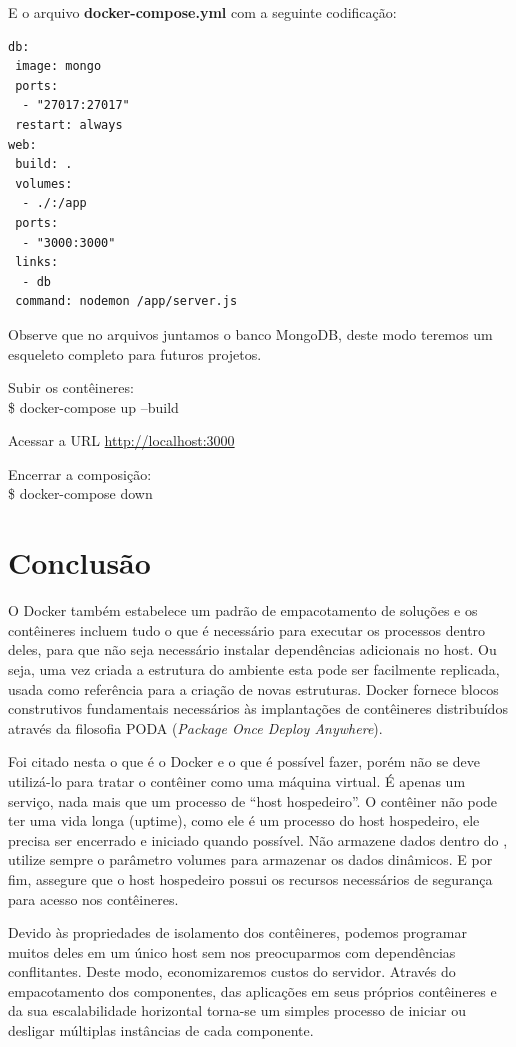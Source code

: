 \documentclass[a4paper,11pt]{article}
\begin{document}
E o arquivo \textbf{docker-compose.yml} com a seguinte codificação:
\begin{lstlisting}
db:
 image: mongo
 ports:
  - "27017:27017"
 restart: always
web:
 build: .
 volumes:
  - ./:/app
 ports:
  - "3000:3000"
 links:
  - db
 command: nodemon /app/server.js
\end{lstlisting}

Observe que no arquivos juntamos o banco MongoDB, deste modo teremos um esqueleto completo para futuros projetos. 

Subir os contêineres: \\
{\ttfamily\$ docker-compose up --build}

Acessar a URL \url{http://localhost:3000}

Encerrar a composição: \\
{\ttfamily\$ docker-compose down}

\section{Conclusão}
O Docker também estabelece um padrão de empacotamento de soluções e os contêineres incluem tudo o que é necessário para executar os processos dentro deles, para que não seja necessário instalar dependências adicionais no host. Ou seja, uma vez criada a estrutura do ambiente esta pode ser facilmente replicada, usada como referência para a criação de novas estruturas. Docker fornece blocos construtivos fundamentais necessários às implantações de contêineres distribuídos através da filosofia PODA (\textit{Package Once Deploy Anywhere}).

Foi citado nesta o que é o Docker e o que é possível fazer, porém não se deve utilizá-lo para tratar o contêiner como uma máquina virtual. É apenas um serviço, nada mais que um processo de ``host hospedeiro''. O contêiner não pode ter uma vida longa (uptime), como ele é um processo do host hospedeiro, ele precisa ser encerrado e iniciado quando possível. Não armazene dados dentro do , utilize sempre o parâmetro volumes para armazenar os dados dinâmicos. E por fim, assegure que o host hospedeiro possui os recursos necessários de segurança para acesso nos contêineres.

Devido às propriedades de isolamento dos contêineres, podemos programar muitos deles em um único host sem nos preocuparmos com dependências conflitantes. Deste modo, economizaremos custos do servidor. Através do empacotamento dos componentes, das aplicações em seus próprios contêineres e da sua escalabilidade horizontal torna-se um simples processo de iniciar ou desligar múltiplas instâncias de cada componente. 
\end{document}

